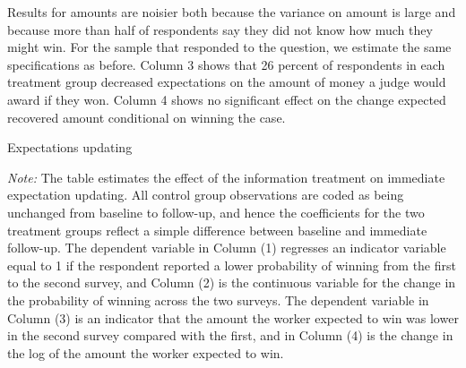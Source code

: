 \documentclass[12 pt]{article}
\newenvironment{figurenotes}[1][\footnotesize{Note}]{\begin{minipage}[t]{\linewidth}\footnotesize{\itshape#1: }}{\end{minipage}}
\begin{document}
Results for amounts are noisier both because the variance on amount is large and because more than half of respondents say they did not know how much they might win. For the sample that responded to the question, we estimate the same specifications as before. Column 3 shows that 26 percent of respondents in each treatment group decreased expectations on the amount of money a judge would award if they won. Column 4 shows no significant effect on the change expected recovered amount conditional on winning the case.


\begin{table}[!ht]
    \caption{Expectations updating} 
    \label{tab:6_TE_updating}
    \center
    \notesize{}
    \begin{figurenotes}
    The table estimates the effect of the information treatment on immediate expectation updating. All control group observations are coded as being unchanged from baseline to follow-up, and hence the coefficients for the two treatment groups reflect a simple difference between baseline and immediate follow-up. The dependent variable in Column (1) regresses an indicator variable equal to 1 if the respondent reported a lower probability of winning from the first to the second survey, and Column (2) is the continuous variable for the change in the probability of winning across the two surveys. The dependent variable in Column (3) is an indicator that the amount the worker expected to win was lower in the second survey compared with the first, and in Column (4) is the change in the log of the amount the worker expected to win.
    \end{figurenotes}
  
\end{table}
\end{document}
